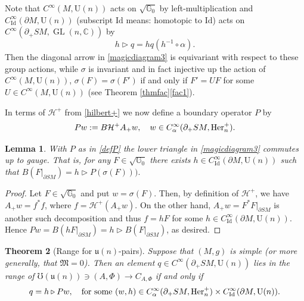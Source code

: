 \documentclass[JEP,XML,SOM,Unicode,published]{cedram}
\DeclareMathOperator{\GL}{GL}
\newcommand{\rU}{\mathrm{U}}
\theoremstyle{plain}
\newtheorem{theorem}{Theorem}[section]
\newtheorem{lemma}[theorem]{Lemma}
\theoremstyle{definition}
\newcommand{\G}{\mathbb{G}}
\newcommand{\C}{\mathbb{C}}
\renewcommand{\H}{\mathcal{H}}
\newcommand{\M}{\mathfrak{M}}
\renewcommand{\u}{\mathfrak{u}}
\newcommand{\he}{\textup{Her}}
\newcommand{\Id}{\mathrm{Id}}
\newcommand{\1}{{\bf 1}}
\let\lact\triangleright
\begin{document}
Note that $C^\infty(M,\rU(n))$ acts on $\sqrt{\G_0}$ by left-multiplication and $C_\Id^\infty(\partial M,\rU(n))$ (subscript $\Id$ means: homotopic to $\Id$) acts on $C^\infty(\partial_+SM,\GL(n,\C))$ by
\begin{equation}\label{uaction}
h\lact q = h q (h^{-1}\circ\alpha).
\end{equation}
Then the diagonal arrow in \eqref{magicdiagram3} is equivariant with respect to these group actions, while $\sigma$ is invariant and in fact injective up the action of $C^\infty(M,\rU(n))$, \ie
$
\sigma(F) = \sigma(F')$ if and only if $F'=UF$ for some $U\in C^\infty(M,\rU(n))$ (see Theorem \ref{thmfac}\eqref{fac1}).

In terms of $\H^+$ from \eqref{hilbert+} we now define a boundary operator $P$ by
\begin{equation}\label{defP}
Pw := B\mathcal{H}^+A_+w,\quad w\in C_\alpha^\infty(\partial_+SM,\he^+_n).
\end{equation}

\begin{lemma}\label{gaugetriangle} With $P$ as in \eqref{defP} the lower triangle in \eqref{magicdiagram3} commutes up to gauge. That is, for any $F\in \sqrt{\G_0}$ there exists $h\in C_\Id^\infty(\partial M,\rU(n))$ such that
$
B(F\vert_{\partial SM}) = h\lact P(\sigma(F))).
$
\end{lemma}

\begin{proof}
Let $F\in \sqrt{\G_0}$ and put $w=\sigma(F)$. Then, by definition of $\H^+$, we have $A_+w = f^* f$, where $f=\H^+(A_+w)$. On the other hand, $A_+w = F^*F\vert_{\partial SM}$ is another such decomposition and thus $f=hF$ for some $h\in C_\Id^\infty(\partial M,\rU(n))$. Hence $Pw=B(hF\vert_{
\partial SM})=h \lact B(F\vert_{\partial SM})$, as desired.
\end{proof}

\begin{theorem}[Range for $\u(n)$-pairs]\label{rangepairs}
Suppose that $(M,g)$ is simple (or more generally, that $\M=0$). Then an element $q\in C^\infty(\partial_+SM,\rU(n))$ lies in the range of $\mho(\u(n))\ni (A,\Phi)\to C_{A,\Phi}$ if and only if
\begin{equation}\label{rangeua}
q=h\lact Pw, \quad \text{for some } (w,h)\in C_\alpha^\infty(\partial_+SM,\he^+_n) \times C^\infty_\Id(\partial M,\rU(n)).
\end{equation}
\end{theorem}
\end{document}
